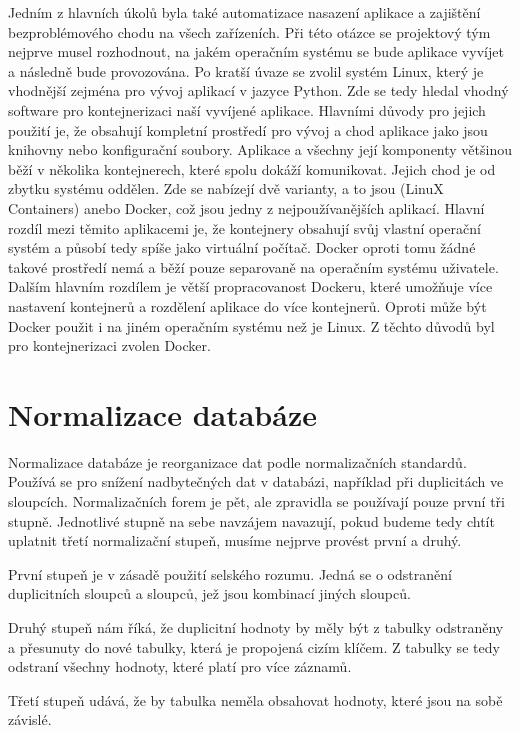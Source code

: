 Jedním z hlavních úkolů byla také automatizace nasazení aplikace a
zajištění bezproblémového chodu na všech zařízeních. Při této otázce
se projektový tým nejprve musel rozhodnout, na jakém operačním systému se bude
aplikace vyvíjet a následně bude provozována. Po kratší úvaze se
zvolil systém Linux, který je vhodnější zejména pro vývoj aplikací v
jazyce Python. Zde se tedy hledal vhodný software pro
kontejnerizaci naší vyvíjené aplikace. Hlavními důvody pro jejich
použití je, že obsahují kompletní prostředí pro vývoj a chod aplikace
jako jsou knihovny nebo konfigurační soubory. Aplikace a všechny její
komponenty většinou běží v několika kontejnerech, které spolu dokáží
komunikovat. Jejich chod je od zbytku systému oddělen. Zde se nabízejí
dvě varianty, a to jsou  (LinuX Containers) anebo Docker, což jsou
jedny z nejpoužívanějších aplikací. Hlavní rozdíl mezi těmito
aplikacemi je, že kontejnery  obsahují svůj vlastní operační systém
a působí tedy spíše jako virtuální počítač. Docker oproti tomu žádné
takové prostředí nemá a běží pouze separovaně na operačním systému
uživatele. Dalším hlavním rozdílem je větší propracovanost Dockeru,
které umožňuje více nastavení kontejnerů a rozdělení aplikace do více
kontejnerů. Oproti  může být Docker použit i na
jiném operačním systému než je Linux. Z těchto důvodů byl pro
kontejnerizaci zvolen Docker. \cite{deployment}

\newpage

\section{Normalizace databáze}

Normalizace databáze je reorganizace dat podle normalizačních standardů. 
Používá se pro snížení nadbytečných dat v databázi, například při duplicitách 
ve sloupcích. Normalizačních forem je pět, ale zpravidla se používají pouze 
první tři stupně. Jednotlivé stupně na sebe navzájem navazují, pokud budeme 
tedy chtít uplatnit třetí normalizační stupeň, musíme nejprve provést první a druhý.

První stupeň je v zásadě použití selského rozumu. Jedná se o odstranění 
duplicitních sloupců a sloupců, jež jsou kombinací jiných sloupců.

Druhý stupeň nám říká, že duplicitní hodnoty by měly být z tabulky odstraněny 
a přesunuty do nové tabulky, která je propojená cizím klíčem. Z tabulky se tedy 
odstraní všechny hodnoty, které platí pro více záznamů.

Třetí stupeň udává, že by tabulka neměla obsahovat hodnoty, které jsou na sobě závislé. 


